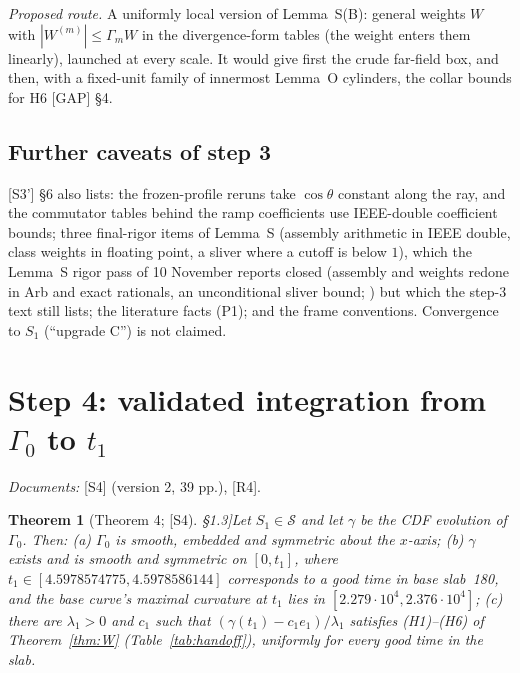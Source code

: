 \documentclass[11pt]{amsart}
\newtheorem{theorem}{Theorem}[section]
\theoremstyle{definition}
\theoremstyle{remark}
\newcommand{\fn}[1]{\texttt{\detokenize{#1}}}
\newcommand{\dref}[1]{[\textsf{#1}]}
\newcommand{\Sset}{\mathcal S}
\begin{document}
\emph{Proposed route.} A uniformly local version of Lemma~S(B): general weights $W$ with $|W^{(m)}|\le\Gamma_mW$ in the divergence-form tables (the weight enters them linearly), launched at every scale. It would give first the crude far-field box, and then, with a fixed-unit family of innermost Lemma~O cylinders, the collar bounds for H6 \dref{GAP} \S4.

\subsection{Further caveats of step 3}\label{ss:caveats}
\dref{S3'} \S6 also lists: the frozen-profile reruns take $\cos\theta$ constant along the ray, and the commutator tables behind the ramp coefficients use IEEE-double coefficient bounds; three final-rigor items of Lemma~S (assembly arithmetic in IEEE double, class weights in floating point, a sliver where a cutoff is below $1$), which the Lemma~S rigor pass of 10 November reports closed (assembly and weights redone in Arb and exact rationals, an unconditional sliver bound; \fn{lemmaS/rigor/RIGOR_PASS.md}) but which the step-3 text still lists; the literature facts (P1); and the frame conventions. Convergence to $S_1$ (``upgrade C'') is not claimed.

\section{Step 4: validated integration from \texorpdfstring{$\Gamma_0$}{Gamma0} to \texorpdfstring{$t_1$}{t1}}\label{s:step4}
\emph{Documents:} \dref{S4} (version 2, 39 pp.), \dref{R4}.

\begin{theorem}[Theorem 4; \dref{S4} \S1.3]\label{thm:4}
Let $S_1\in\Sset$ and let $\gamma$ be the CDF evolution of $\Gamma_0$. Then: (a) $\Gamma_0$ is smooth, embedded and symmetric about the $x$-axis; (b) $\gamma$ exists and is smooth and symmetric on $[0,t_1]$, where $t_1\in[4.5978574775,4.5978586144]$ corresponds to a good time in base slab~180, and the base curve's maximal curvature at $t_1$ lies in $[2.279\cdot10^4,2.376\cdot10^4]$; (c) there are $\lambda_1>0$ and $c_1$ such that $(\gamma(t_1)-c_1e_1)/\lambda_1$ satisfies (H1)--(H6) of Theorem~\ref{thm:W} (Table~\ref{tab:handoff}), uniformly for every good time in the slab.
\end{theorem}
\end{document}
